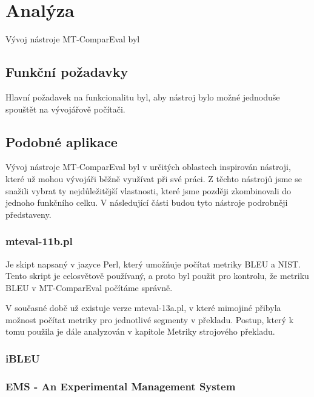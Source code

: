 \chapter{Analýza}
Vývoj nástroje MT-ComparEval byl

\section{Funkční požadavky}
Hlavní požadavek na funkcionalitu byl,
  aby nástroj bylo možné jednoduše spouštět na vývojářově počítači.



\section{Podobné aplikace}
Vývoj nástroje MT-ComparEval byl v určitých oblastech inspirován nástroji,
  které už mohou vývojáři běžně využívat při své práci.
Z těchto nástrojů jsme se snažili vybrat ty nejdůležitější vlastnosti,
  které jsme později zkombinovali do jednoho funkčního celku.
V následující části budou tyto nástroje podrobněji představeny.

\subsection{mteval-11b.pl}
Je skipt napsaný v jazyce Perl, který umožňuje počítat metriky BLEU a NIST.
Tento skript je celosvětově používaný,
  a proto byl použit pro kontrolu,
  že metriku BLEU v MT-ComparEval počítáme správně.

V současné době už existuje verze mteval-13a.pl,
  v které mimojiné přibyla možnost počítat metriky pro jednotlivé segmenty v překladu.
Postup, který k tomu použila je dále analyzován v kapitole Metriky strojového překladu.

\subsection{iBLEU}

\subsection{EMS - An Experimental Management System}
